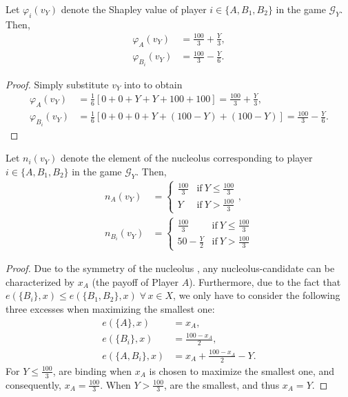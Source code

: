 \begin{proposition}
    \label{prop:shapley_value}
    Let $\varphi_i(v_Y)$ denote the Shapley value of player $i \in \{A, B_1, B_2\}$ in the game $\mathcal{G}_Y$. Then,
    \begin{align*}
        \varphi_A(v_Y) &= \frac{100}{3} + \frac{Y}{3}, \\
        \varphi_{B_i}(v_Y) &= \frac{100}{3} - \frac{Y}{6}.
    \end{align*}
\end{proposition}
\begin{proof}
    Simply substitute $v_Y$ into  to obtain
    \begin{align*}
        \varphi_A(v_Y) &= \frac{1}{6} \left[ 0+0+Y+Y+100+100 \right] = \frac{100}{3} + \frac{Y}{3}, \\
        \varphi_{B_i}(v_Y) &= \frac{1}{6} \left[ 0+0+0+Y+(100-Y)+(100-Y) \right] = \frac{100}{3} - \frac{Y}{6}.
    \end{align*}
\end{proof}

\begin{proposition}
    \label{prop:nucleolus}
    Let $n_i(v_Y)$ denote the element of the nucleolus corresponding to player $i \in \{A, B_1, B_2\}$ in the game $\mathcal{G}_Y$. Then,
    \begin{align*}
        n_A(v_Y) &= \begin{cases}
            \frac{100}{3} & \text{if}\ Y \leq \frac{100}{3} \\
            Y & \text{if}\ Y > \frac{100}{3}
        \end{cases}, \\
        n_{B_i}(v_Y) &= \begin{cases}
            \frac{100}{3} & \text{if}\ Y \leq \frac{100}{3} \\
            50 - \frac{Y}{2} & \text{if}\ Y > \frac{100}{3}
        \end{cases} 
    \end{align*}
\end{proposition}
\begin{proof}
    Due to the symmetry of the nucleolus \parencite{snijders1995axiomatization}, any nucleolus-candidate can be characterized by $x_A$ (the payoff of Player $A$). Furthermore, due to the fact that $e(\{B_i\}, x) \leq e(\{B_1, B_2\}, x) \;\forall\, x\in X$, we only have to consider the following three excesses when maximizing the smallest one:
    \begin{align}
        e(\{A\}, x) &= x_A, \label{eq:excess_A} \\
        e(\{B_i\}, x) &= \frac{100-x_A}{2}, \label{eq:excess_B} \\
        e(\{A, B_i\}, x) &= x_A + \frac{100-x_A}{2} - Y. \label{eq:excess_AB}
    \end{align}
    For $Y \leq \frac{100}{3}$,  are binding when $x_A$ is chosen to maximize the smallest one, and consequently, $x_A = \frac{100}{3}$. When $Y > \frac{100}{3}$,  are the smallest, and thus $x_A = Y$.
\end{proof}

